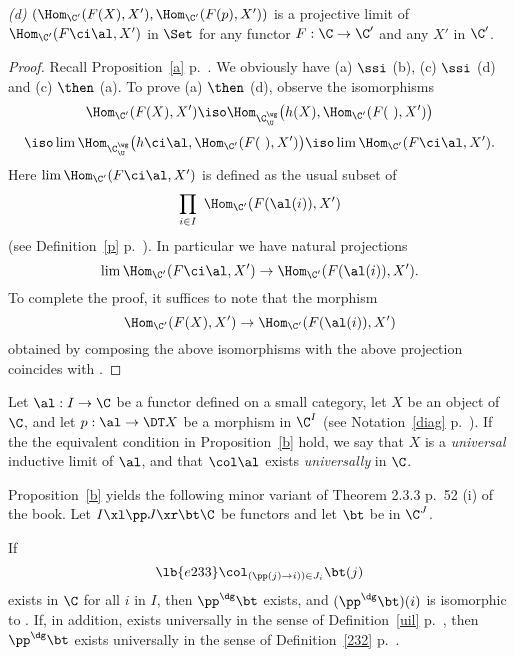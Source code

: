 \documentclass[12pt]{article}
\theoremstyle{remark}
\theoremstyle{definition}
\begin{document}
\begin{s}
\begin{prop}
\nn\emph{(d)} $(\Hom_{\C'}(F(X),X'),\Hom_{\C'}(F(p),X'))$ is a projective limit of $\Hom_{\C'}(F\ci\al,X')$ in $\Set$ for any functor $F:\C\to\C'$ and any $X'$ in $\C'$.
\end{prop}
%
\begin{proof}
Recall Proposition~\ref{a} p.~. We obviously have (a) $\ssi$ (b), (c) $\ssi$ (d) and (c) $\then$ (a). To prove (a) $\then$ (d), observe the isomorphisms
$$
\Hom_{\C'}(F(X),X')\iso\Hom_{\C^\wg_\U}\big(h(X),\Hom_{\C'}(F(\ ),X')\big)
$$
$$
\iso\lim\Hom_{\C^\wg_\U}\big(h\ci\al,\Hom_{\C'}(F(\ ),X')\big)\iso\lim\Hom_{\C'}(F\ci\al,X').
$$ 
Here $\lim\Hom_{\C'}(F\ci\al,X')$ is defined as the usual subset of 
$$
\prod_{i\in I}\ \Hom_{\C'}(F(\al(i)),X')
$$ 
(see Definition~\ref{p} p.~). In particular we have natural projections 
$$
\lim\Hom_{\C'}(F\ci\al,X')\to\Hom_{\C'}(F(\al(i)),X').
$$ 
To complete the proof, it suffices to note that the morphism 
$$
\Hom_{\C'}(F(X),X')\to\Hom_{\C'}(F(\al(i)),X')
$$ 
obtained by composing the above isomorphisms with the above projection coincides with .
\end{proof}
%
\begin{df} 
Let $\al:I\to\C$ be a functor defined on a small category, let $X$ be an object of $\C$, and let $p:\al\to\DT X$ be a morphism in $\C^I$ (see Notation~\ref{diag} p.~). If the the equivalent condition in Proposition~\ref{b} hold, we say that $X$ is a {\em universal} inductive limit of $\al$, and that $\col\al$ exists {\em universally} in $\C$.
\end{df}
\end{s}

%

\begin{s} 
Proposition~\ref{b} yields the following minor variant of Theorem 2.3.3 p.~52 (i) of the book. Let $I\xl\pp J\xr\bt\C$ be functors and let $\bt$ be in $\C^J$. 

\begin{thm}[Theorem 2.3.3 (i) p. 52]
If 
%
\begin{equation}\lb{e233}
\col_{(\pp(j)\to i))\in J_i}\bt(j)
\end{equation}
%
exists in $\C$ for all $i$ in $I$, then $\pp^\dg\bt$ exists, and $(\pp^\dg\bt)(i)$ is isomorphic to . If, in addition,  exists universally in the sense of Definition~\ref{uil} p.~, then $\pp^\dg\bt$ exists universally in the sense of Definition~\ref{232} p.~. 
\end{thm}
\end{s}
\end{document}
